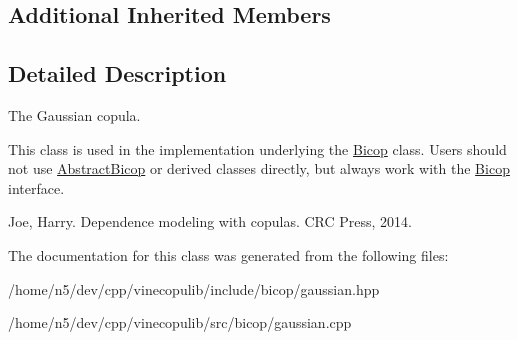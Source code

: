 \subsection*{Additional Inherited Members}


\subsection{Detailed Description}
The Gaussian copula. 

This class is used in the implementation underlying the \hyperlink{classvinecopulib_1_1_bicop}{Bicop} class. Users should not use \hyperlink{classvinecopulib_1_1_abstract_bicop}{Abstract\+Bicop} or derived classes directly, but always work with the \hyperlink{classvinecopulib_1_1_bicop}{Bicop} interface.

Joe, Harry. Dependence modeling with copulas. C\+RC Press, 2014. 

The documentation for this class was generated from the following files\+:\begin{DoxyCompactItemize}
\item 
/home/n5/dev/cpp/vinecopulib/include/bicop/gaussian.\+hpp\item 
/home/n5/dev/cpp/vinecopulib/src/bicop/gaussian.\+cpp\end{DoxyCompactItemize}
